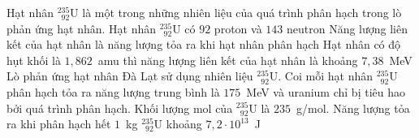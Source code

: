 	\begin{ex}%
		Hạt nhân $^{235}_{\phantom{2}92}\text{U}$ là một trong những nhiên liệu của quá trình phân hạch trong lò phản ứng hạt nhân.
		\choiceTFt
		{\True Hạt nhân $^{235}_{\phantom{2}92}\text{U}$ có $92$ proton và $143$ neutron}
		{Năng lượng liên kết của hạt nhân là năng lượng tỏa ra khi hạt nhân phân hạch}
		{Hạt nhân có độ hụt khối là $1{,}862$~amu thì năng lượng liên kết của hạt nhân là khoảng $7{,}38$~MeV}
		{\True Lò phản ứng hạt nhân Đà Lạt sử dụng nhiên liệu $^{235}_{\phantom{2}92}\text{U}$. Coi mỗi hạt nhân $^{235}_{\phantom{2}92}\text{U}$ phân hạch tỏa ra năng lượng trung bình là $175$~MeV và uranium chỉ bị tiêu hao bởi quá trình phân hạch. Khối lượng mol của $^{235}_{\phantom{2}92}\text{U}$ là $235$~g/mol. Năng lượng tỏa ra khi phân hạch hết $1$~kg $^{235}_{\phantom{2}92}\text{U}$ khoảng $7{,}2\cdot 10^{13}$~J}
	\end{ex}

